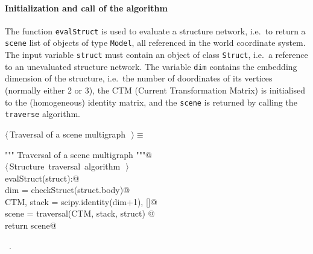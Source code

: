 \documentclass[11pt,oneside]{article}	%
\begin{document}
\paragraph{Initialization and call of the algorithm}

The function \texttt{evalStruct} is used to evaluate a structure network, i.e.~to return a \texttt{scene}
list of objects of type \texttt{Model}, all referenced in the world coordinate system. The input variable \texttt{struct} must contain an object of class \texttt{Struct}, i.e.~a reference to an unevaluated structure network. The variable \texttt{dim}  contains the embedding dimension of the structure, i.e.~the number of doordinates of its vertices (normally either 2 or 3), the CTM (Current Transformation Matrix) is initialised to the (homogeneous) identity matrix, and  the \texttt{scene} is returned by calling the \texttt{traverse} algorithm.

\begin{flushleft} \small \label{scrap36}
$\langle\,$Traversal of a scene multigraph\nobreak\ {\footnotesize {}}$\,\rangle\equiv$
\vspace{-1ex}
\begin{list}{}{} \item
\mbox{}\verb@""" Traversal of a scene multigraph """@\\
\mbox{}\verb@@\hbox{$\langle\,$Structure traversal algorithm\nobreak\ {\footnotesize {}}$\,\rangle$}\verb@@\\
\mbox{}\verb@def evalStruct(struct):@\\
\mbox{}\verb@   dim = checkStruct(struct.body)@\\
\mbox{}\verb@   CTM, stack = scipy.identity(dim+1), []@\\
\mbox{}\verb@   scene = traversal(CTM, stack, struct) @\\
\mbox{}\verb@   return scene@\\
\mbox{}\verb@@{\NWsep}
\end{list}
\vspace{-1ex}
\footnotesize\addtolength{\baselineskip}{-1ex}
\begin{list}{}{\setlength{\itemsep}{-\parsep}\setlength{\itemindent}{-\leftmargin}}
\item \NWtxtMacroRefIn\ .
\end{list}
\end{flushleft}
\end{document}

